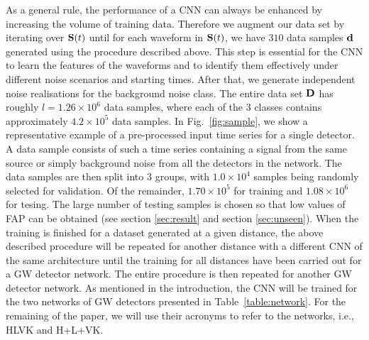\documentclass[aps,twocolumn,showpacs,groupedaddress, nofootinbib]{revtex4}  %
\newcommand{\cm}[1]{\textbf{\textcolor{red}{CM: #1}}}
\begin{document}
%
%
As a general rule, the performance of a \ac{CNN} can always be enhanced by
increasing the volume of training data. Therefore we augment our data set by
iterating over $\bold{S}(t)$ until for each waveform in $\bold{S}(t)$, we have
$310$ data samples $\bold{d}$ generated using the procedure described above.
This step is essential for the \ac{CNN} to learn the features of the waveforms
and to identify them effectively under different noise scenarios and starting
times.  After that, we generate independent noise realisations for the
background noise class. The entire data set $\bold{D}$ has
roughly $l = 1.26 \times 10^{6}$ data samples, where each of the 3 classes
contains approximately $4.2\times10^{5}$ data samples.
%
%
%
%
In Fig.~\ref{fig:sample}, we show a representative example of a pre-processed
input time series for a single detector. A data sample consists of such a
time series containing a signal from the same source or simply background noise
from all the detectors in the network. The data samples are then split into 3
groups, with $1.0\times10^{4}$ samples being randomly selected for validation.
Of the remainder, $1.70\times10^{5}$ for training and $1.08\times10^{6}$ for tesing. 
The large number of testing samples is chosen so that low values of \ac{FAP} can be obtained 
(see section \ref{sec:result} and section \ref{sec:unseen}).
When the training is finished for a dataset generated at a given distance, the above described
procedure will be repeated for another distance with a different \ac{CNN} of 
the same architecture until the training for all
distances have been carried out for a \ac{GW} detector network. The entire
procedure is then repeated for another \ac{GW} detector network. 
As mentioned in the introduction, the \ac{CNN} will be trained for the two networks of
\ac{GW} detectors presented in Table~\ref{table:network}. For the remaining of
the paper, we will use their acronyms to refer to the networks, i.e., HLVK and H+L+VK.
\end{document}
